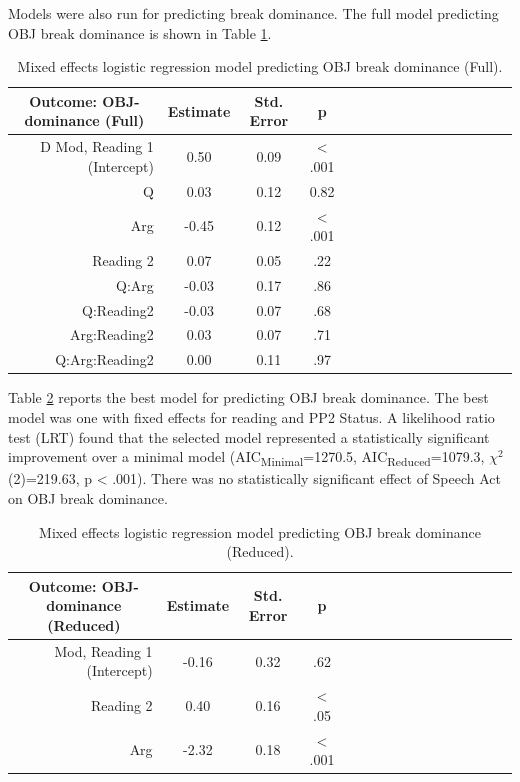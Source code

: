 \documentclass[11pt,oneside]{book}
\begin{document}
Models were also run for predicting break dominance. The full model predicting OBJ break dominance is shown in Table \ref{tab:fodom}.

\begin{table}[!h]

\caption{\label{tab:fodom}Mixed effects logistic regression model predicting OBJ break dominance (Full).}
\centering
\begin{tabular}{rcccrcccrcccrccc}
\toprule
\multicolumn{1}{c}{Outcome: OBJ-dominance (Full)} & \multicolumn{1}{c}{Estimate} & \multicolumn{1}{c}{Std. Error} & \multicolumn{1}{c}{p}\\
\midrule
D Mod, Reading 1 (Intercept) & 0.50 & 0.09 & < .001\\
Q & 0.03 & 0.12 & 0.82\\
Arg & -0.45 & 0.12 & < .001\\
Reading 2 & 0.07 & 0.05 & .22\\
Q:Arg & -0.03 & 0.17 & .86\\
\addlinespace
Q:Reading2 & -0.03 & 0.07 & .68\\
Arg:Reading2 & 0.03 & 0.07 & .71\\
Q:Arg:Reading2 & 0.00 & 0.11 & .97\\
\bottomrule
\end{tabular}
\end{table}

Table \ref{tab:odom} reports the best model for predicting OBJ break dominance. The best model was one with fixed effects for reading and PP2 Status. A likelihood ratio test (LRT) found that the selected model represented a statistically significant improvement over a minimal model (AIC\textsubscript{Minimal}=1270.5, AIC\textsubscript{Reduced}=1079.3, \(\chi^2\)(2)=219.63, p \textless{} .001). There was no statistically significant effect of Speech Act on OBJ break dominance.

\begin{table}[!h]

\caption{\label{tab:odom}Mixed effects logistic regression model predicting OBJ break dominance (Reduced).}
\centering
\begin{tabular}{rcccrcccrcccrccc}
\toprule
\multicolumn{1}{c}{Outcome: OBJ-dominance (Reduced)} & \multicolumn{1}{c}{Estimate} & \multicolumn{1}{c}{Std. Error} & \multicolumn{1}{c}{p}\\
\midrule
Mod, Reading 1 (Intercept) & -0.16 & 0.32 & .62\\
Reading 2 & 0.40 & 0.16 & < .05\\
Arg & -2.32 & 0.18 & < .001\\
\bottomrule
\end{tabular}
\end{table}
\end{document}
